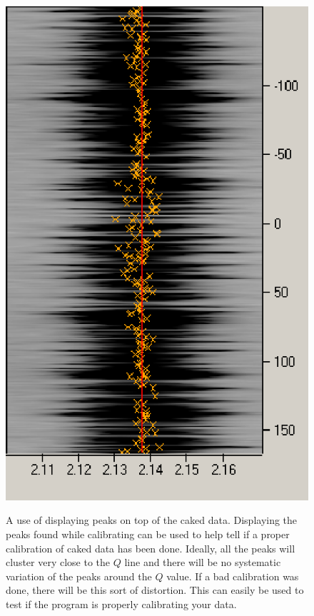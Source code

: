 \begin{figure}
{    \includegraphics[scale=.75]{figures/good_calibration_cake_zoom_peaks.eps}}		
    \caption{A use of displaying peaks on top of the caked 
    data. Displaying the peaks found while calibrating can 
    be used to help tell if a proper calibration of caked 
    data has been done. Ideally, all the peaks will cluster 
    very close to the $Q$ line and there will be no systematic 
    variation of the peaks around the $Q$ value. If a bad 
    calibration was done, there will be this sort of
    distortion. This can easily be used to test if the
    program is properly calibrating your data.}
    \label{calibration_cake}
\end{figure}


